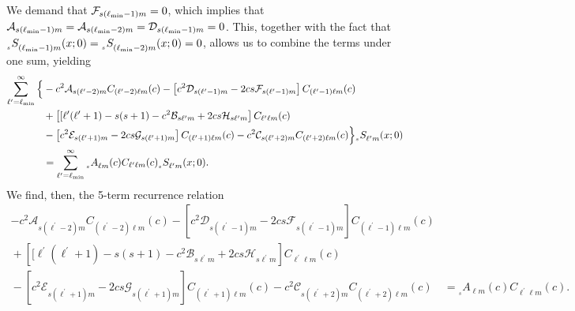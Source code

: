 \documentclass[11pt]{article}
\newcommand{\swS}[5][]{{}_{{}_{#2}}S^{#1}_{#3}(#4;#5)}
\newcommand{\scA}[4][]{{}_{{}_{#2}}A^{#1}_{#3}(#4)}
\begin{document}
We demand that $\mathcal{F}_{s(\ell_{\mbox{\tiny min}}-1){m}}=0$,
which implies that $\mathcal{A}_{s(\ell_{\mbox{\tiny min}}-1){m}} =
\mathcal{A}_{s(\ell_{\mbox{\tiny min}}-2){m}} =
\mathcal{D}_{s(\ell_{\mbox{\tiny min}}-1){m}}=0$.  This, together with the
fact that $\swS{s}{(\ell_{\mbox{\tiny min}}-1){m}}{x}{0} =
\swS{s}{(\ell_{\mbox{\tiny min}}-2){m}}{x}{0} = 0$, allows us to combine the
terms under one sum, yielding
\begin{align}\label{eqn:eigenvalue_eqn:inf}
\sum_{\ell^\prime=\ell_{\mbox{\tiny min}}}^\infty\Big\{
& - c^2 \mathcal{A}_{s(\ell^\prime-2)m} C_{(\ell^\prime-2)\ell{m}}(c)
-  \left[c^2\mathcal{D}_{s(\ell^\prime-1)m} 
            - 2cs\mathcal{F}_{s(\ell^\prime-1)m}\right] C_{(\ell^\prime-1)\ell{m}}(c)
\nonumber \\
&\mbox{} + \left[[\ell^\prime(\ell^\prime+1) -s(s+1) 
       - c^2 \mathcal{B}_{s\ell^\prime{m}} + 2cs\mathcal{H}_{s\ell^\prime{m}}
       \right] C_{\ell^\prime\ell{m}}(c)
\nonumber  \\
&\mbox{} -  \left[c^2\mathcal{E}_{s(\ell^\prime+1)m} 
            - 2cs\mathcal{G}_{s(\ell^\prime+1)m}\right] C_{(\ell^\prime+1)\ell{m}}(c) 
- c^2 \mathcal{C}_{s(\ell^\prime+2)m} 
       C_{(\ell^\prime+2)\ell{m}}(c)\Big\}\swS{s}{\ell^\prime{m}}{x}{0}
\nonumber \\
& =  \sum_{\ell^\prime=\ell_{\mbox{\tiny min}}}^\infty 
   \scA{s}{\ell{m}}{c} C_{\ell^\prime\ell{m}}(c) \swS{s}{\ell^\prime{m}}{x}{0}.
\end{align}
We find, then, the 5-term recurrence relation
\begin{align}
- c^2 \mathcal{A}_{s(\ell^\prime-2)m} C_{(\ell^\prime-2)\ell{m}}(c)
-  \left[c^2\mathcal{D}_{s(\ell^\prime-1)m} 
            - 2cs\mathcal{F}_{s(\ell^\prime-1)m}\right] C_{(\ell^\prime-1)\ell{m}}(c)&
\nonumber \\
\mbox{} + \left[[\ell^\prime(\ell^\prime+1) -s(s+1) 
       - c^2 \mathcal{B}_{s\ell^\prime{m}} + 2cs\mathcal{H}_{s\ell^\prime{m}}
       \right] C_{\ell^\prime\ell{m}}(c)&
\nonumber  \\
\mbox{} -  \left[c^2\mathcal{E}_{s(\ell^\prime+1)m} 
            - 2cs\mathcal{G}_{s(\ell^\prime+1)m}\right] C_{(\ell^\prime+1)\ell{m}}(c) 
- c^2 \mathcal{C}_{s(\ell^\prime+2)m} 
       C_{(\ell^\prime+2)\ell{m}}(c)
& = \scA{s}{\ell{m}}{c} C_{\ell^\prime\ell{m}}(c).
\end{align}
\end{document}
